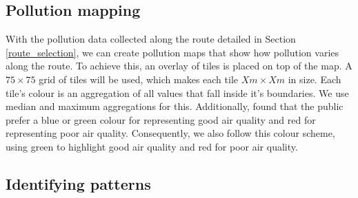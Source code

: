 \documentclass[11pt]{report}
\begin{document}

%
%

\subsection{Pollution mapping}

With the pollution data collected along the route detailed in Section \ref{route_selection}, we can create pollution maps that show how pollution varies along the route. To achieve this, an overlay of tiles is placed on top of the map. A $75 \times 75$ grid of tiles will be used, which makes each tile $Xm \times Xm$ in size. Each tile's colour is an aggregation of all values that fall inside it's boundaries. We use median and maximum aggregations for this. Additionally, \cite{smallbone2012customerinsight} found that the public prefer a blue or green colour for representing good air quality and red for representing poor air quality. Consequently, we also follow this colour scheme, using green to highlight good air quality and red for poor air quality.

\subsection{Identifying patterns}
\end{document}

